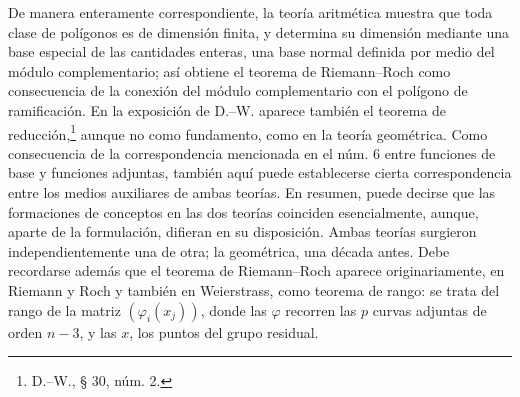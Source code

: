 \documentclass[11pt]{article}
\begin{document}
De manera enteramente correspondiente, la teoría aritmética muestra que toda clase de polígonos es de dimensión finita, y determina su dimensión mediante una base especial de las cantidades enteras, una base normal definida por medio del módulo complementario; así obtiene el teorema de Riemann--Roch como consecuencia de la conexión del módulo complementario con el polígono de ramificación. En la exposición de D.--W. aparece también el teorema de reducción,\footnote{D.--W., § 30, núm. 2.} aunque no como fundamento, como en la teoría geométrica. Como consecuencia de la correspondencia mencionada en el núm. 6 entre funciones de base y funciones adjuntas, también aquí puede establecerse cierta correspondencia entre los medios auxiliares de ambas teorías. En resumen, puede decirse que las formaciones de conceptos en las dos teorías coinciden esencialmente, aunque, aparte de la formulación, difieran en su disposición. Ambas teorías surgieron independientemente una de otra; la geométrica, una década antes. Debe recordarse además que el teorema de Riemann--Roch aparece originariamente, en Riemann y Roch y también en Weierstrass, como teorema de rango: se trata del rango de la matriz \((\varphi_i(x_j))\), donde las \(\varphi\) recorren las \(p\) curvas adjuntas de orden \(n-3\), y las \(x\), los puntos del grupo residual.
\end{document}
